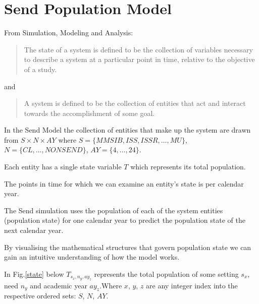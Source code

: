 \documentclass[margin=5mm]{article}
\begin{document}
\section{Send Population Model}

From Simulation, Modeling and Analysis:

\begin{quote}
The state of a system is defined to be the collection of variables
necessary to describe a system at a particular point in time, relative
to the objective of a study.
\end{quote}

and

\begin{quote}
A system is defined to be the collection of entities that act and
interact towards the accomplishment of some goal.
\end{quote}

In the Send Model the collection of entities that make up the system
are drawn from $S \times N \times AY$ where $S = \{MMSIB, ISS, ISSR, \dots, MU\}$,
$N = \{CL, \dots, NONSEND\}$, $AY = \{4, \dots, 24\}$.

Each entity has a single state variable $T$ which represents its total
population.

The points in time for which we can examine an entity's state is per
calendar year.

The Send simulation uses the population of each of the system 
entities (population state) for one calendar year to predict the
population state of the next calendar year.

By visualising the mathematical structures that govern population
state we can gain an intuitive understanding of how the model works.

In Fig.\ref{state} below $T_{s_x,n_y,ay_z}$ represents the total
population of some setting $s_x$, need $n_y$ and academic year
$ay_z$.Where $x$, $y$, $z$ are any integer index into the respective
ordered sets: $S$, $N$, $AY$.
\end{document}
